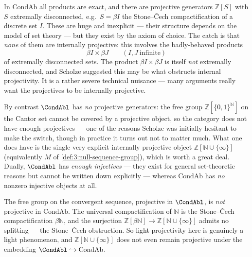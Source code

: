 \begin{remark}
\label{rmk:3:condab-projectives}
In $\mathrm{CondAb}$ all products are exact, and there are projective generators
$\mathbb{Z}[S]$ with $S$ extremally disconnected, e.g.\ $S=\beta I$ the
Stone--\v{C}ech compactification of a discrete set $I$. These are huge and
inexplicit --- their structure depends on the model of set theory --- but they
exist by the axiom of choice. The catch is that \emph{none} of them are
internally projective: this involves the badly-behaved products
\begin{equation*}
\beta I\times\beta J\qquad(I,J\ \text{infinite})
\end{equation*}
of extremally disconnected sets. The product $\beta I\times\beta J$ is itself
\emph{not} extremally disconnected, and Scholze suggested this may be what
obstructs internal projectivity. It is a rather severe technical nuisance ---
many arguments really want the projectives to be internally projective.
\end{remark}

\begin{remark}
\label{rmk:3:light-proj-inj}
By contrast $\CondAbl$ has \emph{no} projective generators: the free group
$\mathbb{Z}[\{0,1\}^{\mathbb{N}}]$ on the Cantor set cannot be covered by a
projective object, so the category does not have enough projectives --- one of
the reasons Scholze was initially hesitant to make the switch, though in practice
it turns out not to matter much. What one does have is the single very explicit
internally projective object $\mathbb{Z}[\mathbb{N}\cup\{\infty\}]$
(equivalently $M$ of \cref{def:3:null-sequence-group}), which is worth a great
deal. Dually, $\CondAbl$ has \emph{enough injectives} --- they exist for general
set-theoretic reasons but cannot be written down explicitly --- whereas
$\mathrm{CondAb}$ has \emph{no} nonzero injective objects at all.
\end{remark}

\begin{remark}
\label{rmk:3:not-projective-all}
The free group on the convergent sequence, projective in $\CondAbl$, is
\emph{not} projective in $\mathrm{CondAb}$. The universal compactification of
$\mathbb{N}$ is the Stone--\v{C}ech compactification $\beta\mathbb{N}$, and the
surjection $\mathbb{Z}[\beta\mathbb{N}]\to\mathbb{Z}[\mathbb{N}\cup\{\infty\}]$
admits no splitting --- the Stone--\v{C}ech obstruction. So light-projectivity
here is genuinely a light phenomenon, and $\mathbb{Z}[\mathbb{N}\cup\{\infty\}]$
does not even remain projective under the embedding $\CondAbl\hookrightarrow
\mathrm{CondAb}$.
\end{remark}

